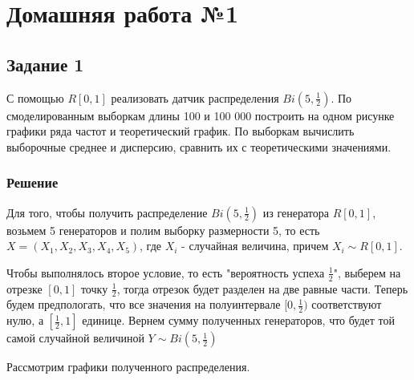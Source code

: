 \documentclass{article}
\begin{document}
\section{Домашняя работа №1}

\subsection{Задание 1}

С помощью $R[0,1]$ реализовать датчик распределения $Bi(5, \frac{1}{2})$. По смоделированным выборкам длины
100 и 100 000 построить на одном рисунке графики ряда частот и теоретический график. По выборкам
вычислить выборочные среднее и дисперсию, сравнить их с теоретическими значениями.

\subsubsection{Решение}
Для того, чтобы получить распределение $Bi(5, \frac{1}{2})$ из генератора $R[0,1]$, 
возьмем 5 генераторов и полим выборку размерности 5, то есть $X = (X_1, X_2, X_3, X_4, X_5)$, где
$X_i$ - случайная величина, причем $X_i \sim R[0, 1]$. 

Чтобы выполнялось второе условие, то есть "вероятность успеха $\frac{1}{2}$", выберем на отрезке
$[0, 1]$ точку $\frac{1}{2}$, тогда отрезок будет разделен на две равные части. Теперь будем
предпологать, что все значения на полуинтервале $[0, \frac{1}{2})$ 
соответствуют нулю, а $[\frac{1}{2}, 1]$ единице. Вернем сумму полученных генераторов, что
будет той самой случайной величиной $Y \sim Bi(5, \frac{1}{2})$

Рассмотрим графики полученного распределения.
\end{document}
